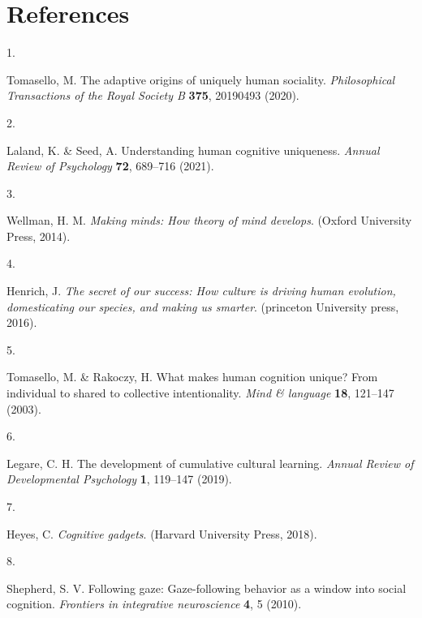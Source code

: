 \documentclass[
  man,floatsintext]{apa6}
\newlength{\cslhangindent}
\newlength{\csllabelwidth}
\newlength{\cslentryspacingunit} %
\newenvironment{CSLReferences}[2] %
 {%
  \setlength{\parindent}{0pt}
  \ifodd #1
  \let\oldpar\par
  \def\par{\hangindent=\cslhangindent\oldpar}
  \fi
  \setlength{\parskip}{#2\cslentryspacingunit}
 }%
 {}
\newcommand{\CSLLeftMargin}[1]{\parbox[t]{\csllabelwidth}{#1}}
\newcommand{\CSLRightInline}[1]{\parbox[t]{\linewidth - \csllabelwidth}{#1}\break}
\begin{document}
\newpage

\hypertarget{references}{%
\section{References}\label{references}}

\hypertarget{refs}{}
\begin{CSLReferences}{0}{0}
\leavevmode{}%
\CSLLeftMargin{1. }%
\CSLRightInline{Tomasello, M. The adaptive origins of uniquely human sociality. \emph{Philosophical Transactions of the Royal Society B} \textbf{375}, 20190493 (2020).}

\leavevmode{}%
\CSLLeftMargin{2. }%
\CSLRightInline{Laland, K. \& Seed, A. Understanding human cognitive uniqueness. \emph{Annual Review of Psychology} \textbf{72}, 689--716 (2021).}

\leavevmode{}%
\CSLLeftMargin{3. }%
\CSLRightInline{Wellman, H. M. \emph{Making minds: How theory of mind develops}. (Oxford University Press, 2014).}

\leavevmode{}%
\CSLLeftMargin{4. }%
\CSLRightInline{Henrich, J. \emph{The secret of our success: How culture is driving human evolution, domesticating our species, and making us smarter}. (princeton University press, 2016).}

\leavevmode{}%
\CSLLeftMargin{5. }%
\CSLRightInline{Tomasello, M. \& Rakoczy, H. What makes human cognition unique? From individual to shared to collective intentionality. \emph{Mind \& language} \textbf{18}, 121--147 (2003).}

\leavevmode{}%
\CSLLeftMargin{6. }%
\CSLRightInline{Legare, C. H. The development of cumulative cultural learning. \emph{Annual Review of Developmental Psychology} \textbf{1}, 119--147 (2019).}

\leavevmode{}%
\CSLLeftMargin{7. }%
\CSLRightInline{Heyes, C. \emph{Cognitive gadgets}. (Harvard University Press, 2018).}

\leavevmode{}%
\CSLLeftMargin{8. }%
\CSLRightInline{Shepherd, S. V. Following gaze: Gaze-following behavior as a window into social cognition. \emph{Frontiers in integrative neuroscience} \textbf{4}, 5 (2010).}


\end{CSLReferences}
\end{document}
